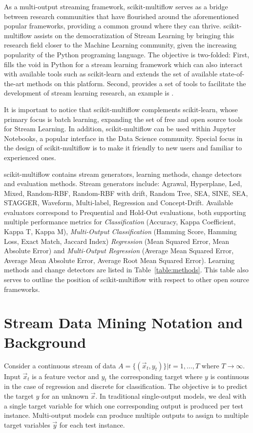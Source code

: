 \documentclass[twoside,11pt]{article}
\newcommand{\skmultiflow}{\textsf{scikit-multiflow}\xspace}
\newcommand{\sklearn}{\textsf{scikit-learn}\xspace}
\newcommand{\reftab}[1]{Table~\ref{#1}}
\begin{document}
As a multi-output streaming framework, \skmultiflow serves as a bridge between research communities that have flourished around the aforementioned popular frameworks, providing a common ground where they can thrive. \skmultiflow assists on the democratization of Stream Learning by bringing this research field closer to the Machine Learning community, given the increasing popularity of the Python programing language. The objective is two-folded: First, fills the void in Python for a stream learning framework which can also interact with available tools such as \sklearn and extends the set of available state-of-the-art methods on this platform. Second, provides a set of tools to facilitate the development of stream learning research, an example is \citep{Montiel2018fsl}.

It is important to notice that \skmultiflow complements \sklearn, whose primary focus is batch learning, expanding the set of free and open source tools for Stream Learning. In addition, \skmultiflow can be used within Jupyter Notebooks, a popular interface in the Data Science community. Special focus in the design of \skmultiflow is to make it friendly to new users and familiar to experienced ones.

\skmultiflow contains stream generators, learning methods, change detectors and evaluation methods. Stream generators include: Agrawal, Hyperplane, Led, Mixed, Random-RBF, Random-RBF with drift, Random Tree, SEA, SINE, SEA, STAGGER, Waveform, Multi-label, Regression and Concept-Drift. Available evaluators correspond to Prequential and Hold-Out evaluations, both supporting multiple performance metrics for \textit{Classification} (Accuracy, Kappa Coefficient, Kappa T, Kappa M), \textit{Multi-Output Classification} (Hamming Score, Hamming Loss, Exact Match, Jaccard Index) \textit{Regression} (Mean Squared Error, Mean Absolute Error) and \textit{Multi-Output Regression} (Average Mean Squared Error, Average Mean Absolute Error, Average Root Mean Squared Error). Learning methods and change detectors are listed in \reftab{table:methods}. This table also serves to outline the position of \skmultiflow with respect to other open source frameworks.

\section{Stream Data Mining Notation and Background}\label{sec:Notation}
Consider a continuous stream of data $A=\{(\vec{x}_t,y_t)\} | t = 1,\ldots,T$ where $T \rightarrow \infty$. Input $\vec{x}_t$ is a feature vector and $y_t$ the corresponding target where $y$ is continuous in the case of regression and discrete for classification. The objective is to predict the target $y$ for an unknown $\vec{x}$. In traditional single-output models, we deal with a single target variable for which one corresponding output is produced per test instance. Multi-output models can produce multiple outputs to assign to multiple target variables $\vec{y}$ for each test instance.
\end{document}

